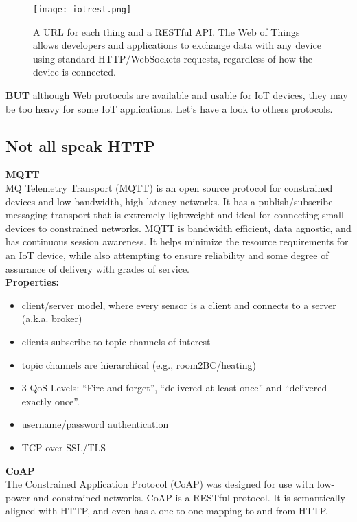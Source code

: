\begin{figure}[H]
  \centering
  \texttt{[image: iotrest.png]}
  \caption{A URL for each thing and a RESTful API.
The Web of Things allows developers and applications to exchange data with any
device using standard HTTP/WebSockets requests, regardless of how the device is
connected.}
  \label{fig:iotrest}
\end{figure}

\textbf{BUT} although Web protocols are available and usable for IoT devices,
they may be too heavy for some IoT applications. Let's have a look to others
protocols.

\subsection{Not all speak HTTP}

\textbf{MQTT}\\

MQ Telemetry Transport (MQTT) is an open source protocol for constrained
devices and low-bandwidth, high-latency networks.
It has a publish/subscribe messaging transport that is extremely lightweight
and ideal for connecting small devices to constrained networks.
MQTT is bandwidth efficient, data agnostic, and has continuous session
awareness. It helps minimize the resource requirements for an IoT device,
while also attempting to ensure reliability and some degree of assurance of
delivery with grades of service.\\

\textbf{Properties:}

\begin{itemize}
    \item client/server model, where every sensor is a client and connects to a
server (a.k.a. broker)
    \item clients subscribe to topic channels of interest
    \item topic channels are hierarchical (e.g., room2BC/heating)
    \item 3 QoS Levels: ``Fire and forget'',  ``delivered at least once'' and
 ``delivered exactly once''.
    \item username/password authentication
    \item TCP over SSL/TLS
\end{itemize}

\textbf{CoAP}\\

The Constrained Application Protocol (CoAP) was designed for use with low-power
and constrained networks. CoAP is a RESTful protocol. It is semantically aligned
with HTTP, and even has a one-to-one mapping to and from HTTP.\\

